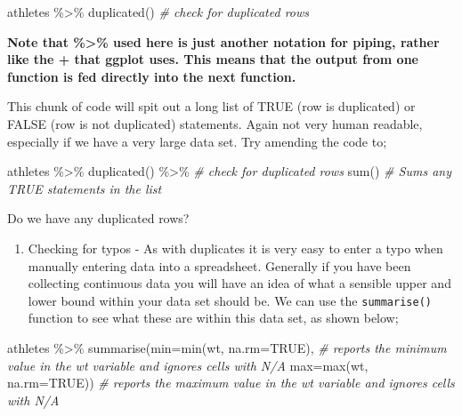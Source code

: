 \documentclass[
]{book}
\newenvironment{Shaded}{\begin{snugshade}}{\end{snugshade}}
\newcommand{\AttributeTok}[1]{\textcolor[rgb]{0.77,0.63,0.00}{#1}}
\newcommand{\CommentTok}[1]{\textcolor[rgb]{0.56,0.35,0.01}{\textit{#1}}}
\newcommand{\ConstantTok}[1]{\textcolor[rgb]{0.00,0.00,0.00}{#1}}
\newcommand{\FunctionTok}[1]{\textcolor[rgb]{0.00,0.00,0.00}{#1}}
\newcommand{\NormalTok}[1]{#1}
\newcommand{\SpecialCharTok}[1]{\textcolor[rgb]{0.00,0.00,0.00}{#1}}
\providecommand{\tightlist}{%
  \setlength{\itemsep}{0pt}\setlength{\parskip}{0pt}}
\begin{document}
\begin{Shaded}
\begin{Highlighting}[]
\NormalTok{athletes }\SpecialCharTok{\%\textgreater{}\%}
  \FunctionTok{duplicated}\NormalTok{() }\CommentTok{\# check for duplicated rows}
\end{Highlighting}
\end{Shaded}

\textbf{Note that \%\textgreater\% used here is just another notation for piping, rather like the + that ggplot uses. This means that the output from one function is fed directly into the next function.}

This chunk of code will spit out a long list of TRUE (row is duplicated) or FALSE (row is not duplicated) statements. Again not very human readable, especially if we have a very large data set. Try amending the code to;

\begin{Shaded}
\begin{Highlighting}[]
\NormalTok{athletes }\SpecialCharTok{\%\textgreater{}\%}
  \FunctionTok{duplicated}\NormalTok{() }\SpecialCharTok{\%\textgreater{}\%} \CommentTok{\# check for duplicated rows}
  \FunctionTok{sum}\NormalTok{() }\CommentTok{\# Sums any TRUE statements in the list }
\end{Highlighting}
\end{Shaded}

Do we have any duplicated rows?

\begin{enumerate}
\def\labelenumi{\arabic{enumi})}
\setcounter{enumi}{1}
\tightlist
\item
  Checking for typos - As with duplicates it is very easy to enter a typo when manually entering data into a spreadsheet. Generally if you have been collecting continuous data you will have an idea of what a sensible upper and lower bound within your data set should be. We can use the \texttt{summarise()} function to see what these are within this data set, as shown below;
\end{enumerate}

\begin{Shaded}
\begin{Highlighting}[]
\NormalTok{athletes }\SpecialCharTok{\%\textgreater{}\%} 
  \FunctionTok{summarise}\NormalTok{(}\AttributeTok{min=}\FunctionTok{min}\NormalTok{(wt, }\AttributeTok{na.rm=}\ConstantTok{TRUE}\NormalTok{), }\CommentTok{\# reports the minimum value in the wt variable and ignores cells with N/A}
            \AttributeTok{max=}\FunctionTok{max}\NormalTok{(wt, }\AttributeTok{na.rm=}\ConstantTok{TRUE}\NormalTok{)) }\CommentTok{\# reports the maximum value in the wt variable and ignores cells with N/A}
\end{Highlighting}
\end{Shaded}
\end{document}
